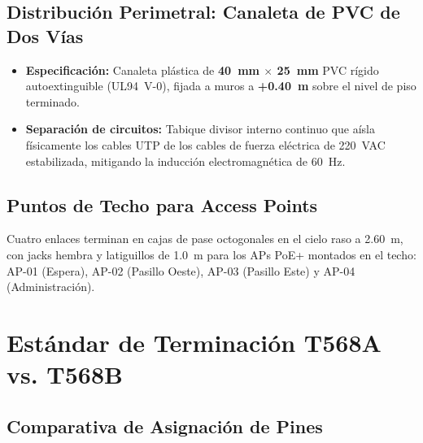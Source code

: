 \subsection{Distribución Perimetral: Canaleta de PVC de Dos Vías}

\begin{itemize}[leftmargin=*]
    \item \textbf{Especificación:} Canaleta plástica de \textbf{40~mm $\times$ 25~mm} PVC rígido autoextinguible (UL94~V-0), fijada a muros a \textbf{+0.40~m} sobre el nivel de piso terminado.
    \item \textbf{Separación de circuitos:} Tabique divisor interno continuo que aísla físicamente los cables UTP de los cables de fuerza eléctrica de 220~VAC estabilizada, mitigando la inducción electromagnética de 60~Hz.
\end{itemize}

\subsection{Puntos de Techo para Access Points}

Cuatro enlaces terminan en cajas de pase octogonales en el cielo raso a 2.60~m, con jacks hembra y latiguillos de 1.0~m para los APs PoE+ montados en el techo: AP-01 (Espera), AP-02 (Pasillo Oeste), AP-03 (Pasillo Este) y AP-04 (Administración).

\section{Estándar de Terminación T568A vs. T568B}

\subsection{Comparativa de Asignación de Pines}

